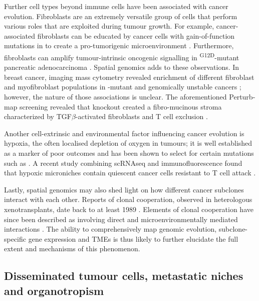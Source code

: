 Further cell types beyond immune cells have been associated with cancer evolution. Fibroblasts are an extremely versatile group of cells that perform various roles that are exploited during tumour growth. For example, cancer-associated fibroblasts can be educated by cancer cells with gain-of-function mutations in  to create a pro-tumorigenic microenvironment \parencite{Vennin2019-cf}. Furthermore, fibroblasts can amplify tumour-intrinsic oncogenic signalling in \textsuperscript{G12D}-mutant pancreatic adenocarcinoma \parencite{Tape2016-hb}. Spatial genomics adds to these observations. In breast cancer, imaging mass cytometry  revealed enrichment of different fibroblast and myofibroblast populations in -mutant and genomically unstable cancers \parencite{Ali2020-zo}; however, the nature of those associations is unclear. The aforementioned Perturb-map screening revealed that  knockout created a fibro-mucinous stroma characterized by TGF$\beta$-activated fibroblasts and T cell exclusion \parencite{Dhainaut2022-nj}.

Another cell-extrinsic and environmental factor influencing cancer evolution is hypoxia, the often localised depletion of oxygen in tumours; it is well established as a marker of poor outcomes \parencite{Harris2002-ty} and has been shown to select for certain mutations such as  \parencite{Graeber1996-em}. A recent study combining \ac{scRNAseq} and immunofluorescence found that hypoxic microniches contain quiescent cancer cells resistant to T cell attack \parencite{Baldominos2022-xe}.

Lastly, spatial genomics may also shed light on how different cancer subclones interact with each other. Reports of clonal cooperation, observed in heterologous xenotransplants, date back to at least 1989 \parencite{Miller1989-hp}. Elements of clonal cooperation have since been described as involving direct and microenvironmentally mediated interactions \parencite{Alonso-Curbelo2021-dq,Cleary2014-hg,Zhou2017-nm,Tammela2017-nd,Williams2020-fj}. The ability to comprehensively map genomic evolution, subclone-specific gene expression and \acp{TME} is thus likely to further elucidate the full extent and mechanisms of this phenomenon.

\subsection*{Disseminated tumour cells, metastatic niches and organotropism}

